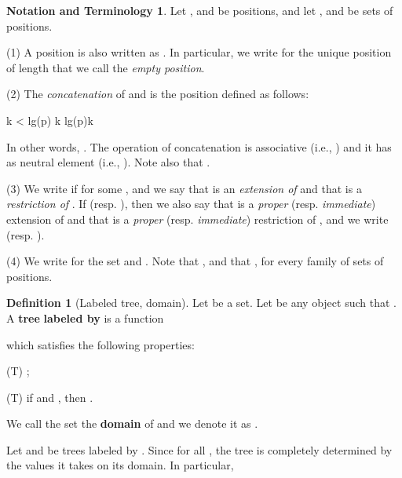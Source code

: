 \documentclass[copyright,creativecommons]{eptcs}
\def\ie{i.e., }
\newcommand{\NN}{\mathbb{N}}
\newcommand{\len}{\textnormal{lg}}
\theoremstyle{definition}
\newtheorem{Definition}[theorem]{Definition}
\newtheorem{notation}[theorem]{Notation and Terminology}{\bfseries}{}
\newcommand{\squishlist}{
 \begin{list}{}
  { \setlength{\itemsep}{0pt}
     \setlength{\parsep}{3pt}
     \setlength{\topsep}{3pt}
     \setlength{\partopsep}{0pt}
     \setlength{\leftmargin}{1em}
     \setlength{\labelwidth}{1.5em}
     \setlength{\labelsep}{0.5em} } }
\newcommand{\squishend}{
  \end{list}  }
\begin{document}
\begin{notation} Let ,  and  be positions,
and let ,  and  be sets of positions.

(1) A position   is also written  as .
In particular, we write  for the unique position of length  that we call the \emph{empty position}.

(2)
The \emph{concatenation}
of   and 
is the position  defined as follows:

\squishlist
\item[] {\centering
  k < \len(p)  k \geq \len(p)k \in \NN \par}
\squishend


\noindent In other words,
.
The operation of concatenation
is associative (\ie )
and it has  as neutral element (\ie ). Note also that .



(3) We write      if
  for some , and we
 say that  is an \emph{extension of} 
and that  is a \emph{restriction of} .
If  (resp. ), then we also say that  is a \emph{proper}
(resp. \emph{immediate}) extension of 
and that  is a  \emph{proper} (resp. \emph{immediate})  restriction of , and we write  (resp. ).


(4) We write 
for the set
  and .
Note that ,
and that , for every family  of sets
of positions.
 \hfill 
\end{notation}








\begin{Definition}[Labeled tree, domain] \label{tree}  Let  be a set.
Let  be any object such that
.
A \textbf{tree}  \textbf{labeled by}  is a function

which satisfies the following properties:
\squishlist
\item[ (T)] ;
\item[ (T)]  if  and ,  then .
\squishend
We call  the set  the \textbf{domain}
of  and we denote it as . \hfill 
\end{Definition}

Let  and  be  trees labeled by .
Since   for all
,  the tree  is completely determined
by  the values it takes on its domain.
In particular,
\squishlist
\item[] 
\squishend
\end{document}
